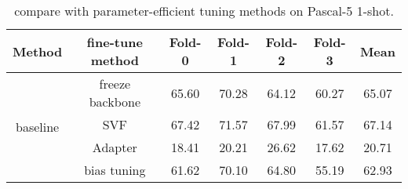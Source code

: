 \documentclass{article}
\begin{document}
\begin{table}[]\scriptsize
\centering
\renewcommand\arraystretch{1.1}
\caption{compare with parameter-efficient tuning methods on Pascal-5 1-shot.}
\label{tab:adapter}
\begin{tabular}{c|c|cccc|c}
\hline
Method & fine-tune method & Fold-0 & Fold-1 & Fold-2 & Fold-3 & Mean  \\ \hline
\multirow{4}{*}{baseline} & freeze backbone & 65.60 & 70.28 & 64.12 & 60.27 & 65.07 \\
				
    & SVF &67.42&	71.57&	67.99&	61.57&	67.14 \\
    & Adapter & 18.41&	20.21&	26.62&	17.62&	20.71 \\  
    & bias tuning  & 61.62&	70.10&	64.80&	55.19&	62.93 \\ \hline 
\end{tabular}
\end{table}
\end{document}
